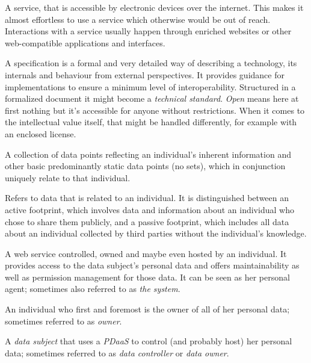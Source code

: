 \documentclass[12pt,english,a4paper,titlepage,cleardoublepage=empty,dottedtoc]{report}
\providecommand{\tightlist}{%
  \setlength{\itemsep}{0pt}\setlength{\parskip}{0pt}}
\begin{document}
\begin{description}
\tightlist
\item[Web Service:]
A service, that is accessible by electronic devices over the internet.
This makes it almost effortless to use a service which otherwise would
be out of reach. Interactions with a service usually happen through
enriched websites or other web-compatible applications and interfaces.
\item[Open Specification:]
A specification is a formal and very detailed way of describing a
technology, its internals and behaviour from external perspectives. It
provides guidance for implementations to ensure a minimum level of
interoperability. Structured in a formalized document it might become a
\emph{technical standard}. \emph{Open} means here at first nothing but
it's accessible for anyone without restrictions. When it comes to the
intellectual value itself, that might be handled differently, for
example with an enclosed license.
\item[\protect\hypertarget{terminologies--profile-data}{}{Profile
Data}:]
A collection of data points reflecting an individual's inherent
information and other basic predominantly static data points (no sets),
which in conjunction uniquely relate to that individual.
\item[\protect\hypertarget{terminologies--digital-footprint}{}{Digital
Footprint}:]
Refers to data that is related to an individual. It is distinguished
between an active footprint, which involves data and information about
an individual who chose to share them publicly, and a passive footprint,
which includes all data about an individual collected by third parties
without the individual's knowledge.
\item[Personal Data as a Service (PDaaS):]
A web service controlled, owned and maybe even hosted by an individual.
It provides access to the data subject's personal data and offers
maintainability as well as permission management for those data. It can
be seen as her personal agent; sometimes also referred to as \emph{the
system}.
\item[Data Subject:]
An individual who first and foremost is the owner of all of her personal
data; sometimes referred to as \emph{owner}.
\item[\protect\hypertarget{terminologies--operator}{}{Operator}:]
A \emph{data subject} that uses a \emph{PDaaS} to control (and probably
host) her personal data; sometimes referred to as \emph{data controller}
or \emph{data owner}.
\item[\protect\hypertarget{terminologies--consumer}{}{(Data) Consumer}:]

\end{description}
\end{document}
